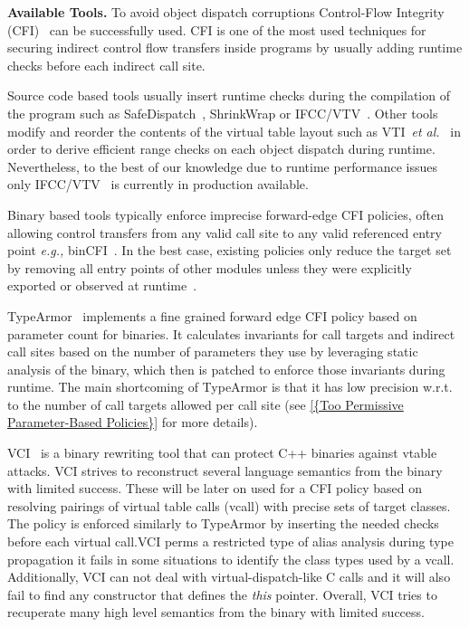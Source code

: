 \textbf{Available Tools.}
To avoid object dispatch corruptions Control-Flow Integrity (CFI)~\cite{abadi:cfi2, abadi:cfi} can be successfully used.
CFI is one of the most used techniques for securing indirect control flow transfers inside programs
by usually adding runtime checks before each indirect call site.

Source code based tools usually insert runtime checks during the compilation of 
the program such as SafeDispatch~\cite{safedispatch:jang}, ShrinkWrap \cite{haller:shrinkwrap} or IFCC/VTV~\cite{vtv:tice}.
Other tools modify and reorder the contents of the virtual table layout such as VTI~\textit{et al.}~\cite{bounov:interleaving} 
in order to derive efficient range checks on each object dispatch during runtime. Nevertheless, to the best of our knowledge 
due to runtime performance issues only IFCC/VTV~\cite{vtv:tice} is currently in production available.

Binary based tools typically enforce imprecise forward-edge CFI 
policies, often allowing control transfers from any valid call site 
to any valid referenced entry point \textit{e.g.,} binCFI~\cite{ccfir:zhang, zhang:usenix}. 
In the best case, existing policies only reduce the target set by
removing all entry points of other modules unless they were
explicitly exported or observed at runtime~\cite{payer:dimva}. 

TypeArmor~\cite{veen:typearmor} implements a fine grained forward edge CFI 
policy based on parameter count for binaries. It calculates invariants for call targets and indirect call sites based on
the number of parameters they use by leveraging static analysis of the binary, which then is
patched to enforce those invariants during runtime. 
The main shortcoming of TypeArmor is that it has low precision 
w.r.t. to the number of call targets allowed per call site 
(see \cref{{Too Permissive Parameter-Based Policies}} for more details).

VCI~\cite{vci:asiaccs} is a binary rewriting tool that can protect C++ binaries against 
vtable attacks. VCI strives to reconstruct several language semantics from the binary with limited success.
These will be later on used for a CFI policy based on resolving pairings of virtual table calls (vcall)
with precise sets of target classes. The policy is enforced similarly to TypeArmor by inserting the 
needed checks before each virtual call.VCI perms a restricted type of alias analysis during type propagation it
fails in some situations to identify the class types used by a vcall. Additionally, VCI can not deal with 
virtual-dispatch-like C calls and it will also fail to find any
constructor that defines the \textit{this} pointer. Overall, VCI tries to recuperate many high level 
semantics from the binary with limited success.

